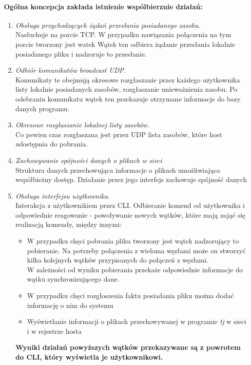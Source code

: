 \documentclass[11pt,oneside]{book}
\newcommand{\+}{\discretionary{\mbox{\scriptsize$\hookleftarrow$}}{}{}}
\begin{document}
\paragraph{Ogólna koncepcja zakłada istnienie wspólbierznie działań:}
\begin{enumerate}
	\item 
	\textsl{Obsługa przychodzących żądań przesłania posiadanego zasobu.}\\
	Nasłuchuje na porcie TCP. W przypadku nawiązania połączenia na tym porcie tworzony jest watek  Wątek ten odbiera żądanie przesłania lokalnie posiadanego pliku i nadzoruje to przesłanie. 
	\item
	\textsl{Odbiór komunikatów broadcast UDP.}\\
	Komunikaty te obejmują okresowe rozgłaszanie przez każdego użytkownika listy lokalnie posiadanych zasobów, rozgłaszanie unieważnienia zasobu. Po odebraniu komunikatu wątek ten przekazuje otrzymane informacje do bazy danych programu.
	\item
	\textsl{Okresowe rozgłaszanie lokalnej listy zasobów.}\\
	Co pewien czas rozgłaszana jest przez UDP lista zasobów, które host udostępnia do pobrania.
	\item
	\textsl{Zachowywanie spójności danych o plikach w sieci}\\
	Struktura danych przechowująca informacje o plikach umożliwiająca współbieżny dostęp. Działanie przez jego interfejs zachowuje spójność danych
	\item
	\textsl{Obsługa interfejsu użytkownika.}\\
	Interakcja z użytkownikiem przez CLI. Odbieranie komend od użytkownika i odpowiednie reagowanie - powoływanie nowych wątków, które mają zająć się realizacją komendy, między innymi: 
	\begin{itemize}
		\item
		W przypadku chęci pobrania pliku tworzony jest wątek nadzorujący to pobieranie. Na potrzeby połączenia z wieloma węzłami może on stworzyć kilka kolejnych wątków przypisanych do połączeń z węzłami.\\
		W zależności od wyniku pobierania przekaże odpowiednie informacje do wątku synchronizującego dane.
		\item
		W przypadku chęci rozgłoszenia faktu posiadania pliku można dodać informację o nim do systemu
		\item
		Wyświetlanie informacji o plikach przechowywanej w programie \textit{tj} w sieci i w rejestrze hosta
	\end{itemize}
	\textbf{Wyniki działań powyższych wątków przekazywane są z powrotem do CLI, który wyświetla je użytkownikowi.}
\end{enumerate}
\end{document}
